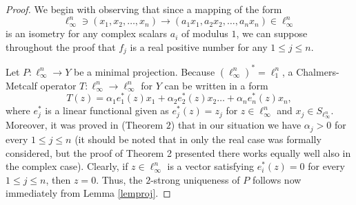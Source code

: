 \documentclass[12pt, reqno]{amsart}
\theoremstyle{definition}
\theoremstyle{remark}
\numberwithin{equation}{section}
\begin{document}
\begin{proof}
 We begin with observing that since a mapping of the form
$$\ell_{\infty}^n \ni (x_1, x_2, \ldots, x_n) \to (a_1x_1, a_2x_2, \ldots, a_nx_n) \in \ell_{\infty}^n$$
is an isometry for any complex scalars $a_i$ of modulus $1$, we can suppose throughout the proof that $f_j$ is a real positive number for any $1 \leq j \leq n$.

Let $P: \ell_{\infty}^n \to Y$ be a minimal projection. Because $(\ell_{\infty}^n)^*=\ell^n_1$, a Chalmers-Metcalf operator $T: \ell_{\infty}^n \to \ell_{\infty}^n$ for $Y$ can be written in a form
$$T(z) = \alpha_1 e_1^*(z) x_1 + \alpha_2 e_2^*(z) x_2 \ldots + \alpha_n e_n^*(z) x_n,$$
where $e_j^*$ is a linear functional given as $e_j^*(z)=z_j$ for $z \in \ell_{\infty}^n$ and $x_j \in S_{\ell_{\infty}^n}$. Moreover, it was proved in \cite{skrzypekoperator} (Theorem $2$) that in our situation we have $\alpha_j>0$ for every $1 \leq j \leq n$ (it should be noted that in \cite{skrzypekoperator} only the real case was formally considered, but the proof of Theorem 2 presented there works equally well also in the complex case). Clearly, if $z \in \ell_{\infty}^n$ is a vector satisfying $e_i^*(z)=0$ for every $1 \leq j \leq n$, then $z=0$. Thus, the $2$-strong uniqueness of $P$ follows now immediately from Lemma \ref{lemproj}. 


\end{proof}
\end{document}
